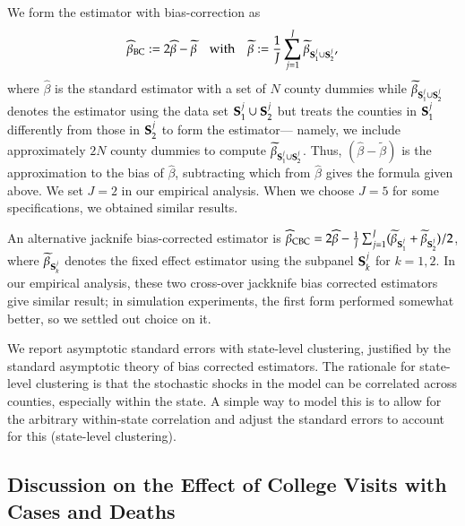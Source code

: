 \documentclass[9pt,twoside,lineno]{pnas-new}
\theoremstyle{definition}
\begin{document}
 We form the estimator with bias-correction as
$$
\widehat \beta_{\rm BC}  :=  2 \widehat \beta -  \widetilde \beta\quad\text{with}\quad
 \widetilde \beta := \frac{1}{J}\sum_{j=1}^J\widetilde \beta_{{\bf S}^j_1\cup{\bf S}_2^j},
$$
where $\widehat \beta$ is the standard estimator with  a set of $N$ county dummies while $\widetilde \beta_{{\bf S}_1^j\cup{\bf S}_2^j}$ denotes the estimator using the data set  ${\bf S}^j_1\cup{\bf S}_2^j$ but treats the counties in  ${\bf S}^j_1$ differently from those in  ${\bf S}^j_2$ to form the estimator--- namely, we include approximately $2N$ county dummies to compute $\widetilde \beta_{{\bf S}^j_1\cup{\bf S}^j_2}$. Thus, $(\widehat \beta -  \widetilde \beta)$ is the approximation to the bias of $\widehat \beta$, subtracting which from $\widehat \beta$ gives the formula given above. 
We set $J=2$ in our empirical analysis. When we choose $J=5$ for some specifications, we  obtained similar results.
 
An alternative  jacknife bias-corrected estimator is $\widehat \beta_{\rm CBC}  =  2 \widehat \beta -  \frac{1}{J}\sum_{j=1}^J(\widetilde \beta_{{\bf S}_1^j}+\widetilde \beta_{{\bf S}_2^j})/2$, where $\widetilde \beta_{{\bf S}_k^j}$  denotes the fixed effect estimator using the subpanel  ${\bf S}_k^j$ for $k=1,2$. In our empirical analysis, these two cross-over jackknife bias corrected estimators give  similar result; in simulation experiments, the first form performed somewhat better, so we settled out choice on it.
  
  We report asymptotic standard errors with state-level clustering, justified by the standard asymptotic theory of bias corrected estimators. The rationale for state-level clustering is that the stochastic shocks in the model can be correlated across counties, especially within the state.  A simple way to model this is to allow for the arbitrary within-state correlation and adjust the standard errors to account for this (state-level clustering).   
   
   
\subsection*{Discussion on the Effect of College Visits with Cases and Deaths}
\end{document}
